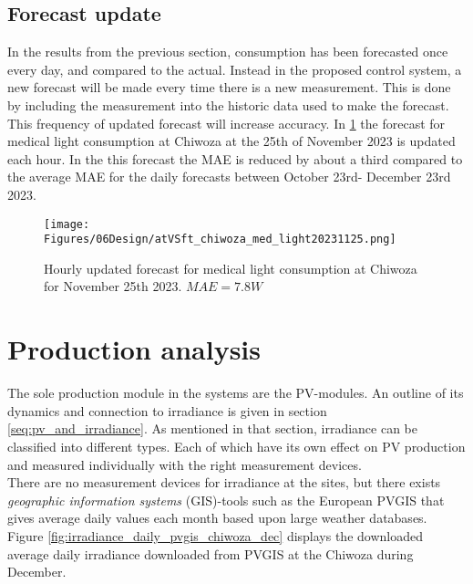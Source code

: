\subsection{Forecast update}
In the results from the previous section, consumption has been forecasted once every day, and compared to the actual. Instead in the proposed control system, a new forecast will be made every time there is a new measurement. This is done by including the measurement into the historic data used to make the forecast. This frequency of updated forecast will increase accuracy. In \ref{fig:atVSft_chiwoza_med_light20231125} the forecast for medical light consumption at Chiwoza at the 25th of November 2023 is updated each hour. In the this forecast the MAE is reduced by about a third compared to the average MAE for the daily forecasts between October 23rd- December 23rd 2023.\\
 

\begin{figure}
    \centering
    \texttt{[image: Figures/06Design/atVSft\_chiwoza\_med\_light20231125.png]}
    \caption[Hourly updated forecast Chiwoza medical light]{Hourly updated forecast for medical light consumption at Chiwoza for November 25th 2023. $MAE=7.8W$}
    \label{fig:atVSft_chiwoza_med_light20231125}
\end{figure}



\section{Production analysis}\label{seq:prod_analysis}

The sole production module in the systems are the PV-modules. An outline of its dynamics and connection to irradiance is given in section \ref{seq:pv_and_irradiance}. As mentioned in that section, irradiance can be classified into different types. Each of which have its own effect on PV production and measured individually with the right measurement devices.\\

There are no measurement devices for irradiance at the sites, but there exists \textit{geographic information systems} (GIS)-tools such as the European PVGIS\cite{pvgis} that gives average daily values each month based upon large weather databases. Figure \ref{fig:irradiance_daily_pvgis_chiwoza_dec} displays the downloaded average daily irradiance downloaded from PVGIS at the Chiwoza during December.\\

